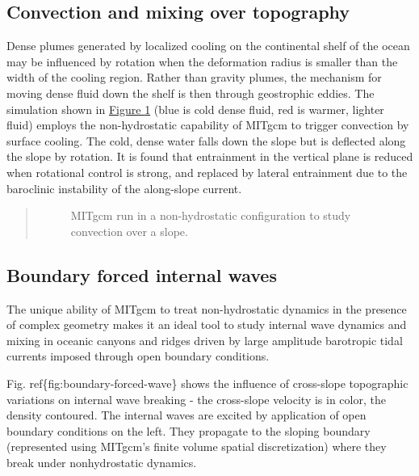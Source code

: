 \documentclass[letterpaper,10pt,english]{sphinxmanual}
\begin{document}
\subsection{Convection and mixing over topography}
\label{\detokenize{overview/overview:convection-and-mixing-over-topography}}
Dense plumes generated by localized cooling on the continental shelf of the
ocean may be influenced by rotation when the deformation radius is smaller
than the width of the cooling region. Rather than gravity plumes, the
mechanism for moving dense fluid down the shelf is then through geostrophic
eddies. The simulation shown in \hyperref[\detokenize{overview/overview:fig-convect-and-topo}]{Figure \ref{\detokenize{overview/overview:fig-convect-and-topo}}}
(blue is cold dense fluid, red is
warmer, lighter fluid) employs the non-hydrostatic capability of MITgcm to
trigger convection by surface cooling. The cold, dense water falls down the
slope but is deflected along the slope by rotation. It is found that
entrainment in the vertical plane is reduced when rotational control is
strong, and replaced by lateral entrainment due to the baroclinic
instability of the along-slope current.
\begin{quote}
\begin{figure}[htbp]
\centering
\capstart

\noindent{}
\caption{MITgcm run in a non-hydrostatic configuration to study convection over a slope.}\label{\detokenize{overview/overview:fig-convect-and-topo}}\end{figure}
\end{quote}


\subsection{Boundary forced internal waves}
\label{\detokenize{overview/overview:boundary-forced-internal-waves}}
The unique ability of MITgcm to treat non-hydrostatic dynamics in the
presence of complex geometry makes it an ideal tool to study internal wave
dynamics and mixing in oceanic canyons and ridges driven by large amplitude
barotropic tidal currents imposed through open boundary conditions.

Fig. ref\{fig:boundary-forced-wave\} shows the influence of cross-slope
topographic variations on
internal wave breaking - the cross-slope velocity is in color, the density
contoured. The internal waves are excited by application of open boundary
conditions on the left. They propagate to the sloping boundary (represented
using MITgcm's finite volume spatial discretization) where they break under
nonhydrostatic dynamics.
\end{document}
